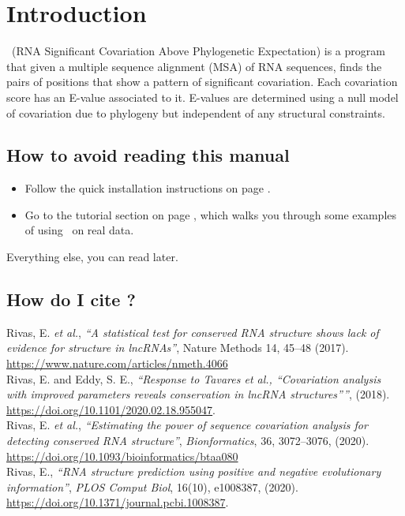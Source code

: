 \section{Introduction}
\setcounter{footnote}{0}

\rscape\ (RNA Significant Covariation Above Phylogenetic Expectation)
is a program that given a multiple sequence alignment (MSA) of RNA
sequences, finds the pairs of positions that show a pattern of
significant covariation. Each covariation score has an E-value
associated to it. E-values are determined using a null model of
covariation due to phylogeny but independent of any structural
constraints. 

\subsection{How to avoid reading this manual}

\begin{itemize}
\item Follow the quick installation instructions on page
      \pageref{section:installation}. 
\item Go to the tutorial section on page
\pageref{section:tutorial}, which walks you through some examples of
using \rscape\ on real data.
\end{itemize}

Everything else, you can read later.



\subsection{How do I cite \rscape?}

Rivas, E. \textit{et al.}, \textit{``A statistical test for conserved
  RNA structure shows lack of evidence for structure in lncRNAs''},
Nature Methods 14, 45–48 (2017).\\
\url{https://www.nature.com/articles/nmeth.4066}\\

\noindent
Rivas, E. and Eddy, S. E., \textit{``Response to Tavares et al.,
  “Covariation analysis with improved parameters reveals conservation
  in lncRNA structures”''}, (2018).\\
\url{https://doi.org/10.1101/2020.02.18.955047}.\\

\noindent
Rivas, E. \textit{et al.}, \textit{``Estimating the power of sequence
  covariation analysis for detecting conserved RNA structure''},
\textit{Bionformatics}, 36, 3072–3076, (2020).\\
\url{https://doi.org/10.1093/bioinformatics/btaa080}\\

\noindent
Rivas, E., \textit{``RNA structure prediction using
  positive and negative evolutionary information''},
\textit{PLOS Comput Biol}, 16(10), e1008387, (2020).\\
\url{https://doi.org/10.1371/journal.pcbi.1008387}.\\






  









